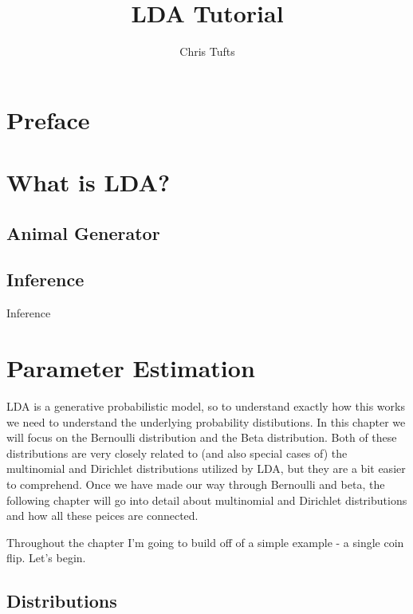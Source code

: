 \documentclass[]{book}
\title{LDA Tutorial}
\author{Chris Tufts}
\date{}
\theoremstyle{definition}
\theoremstyle{definition}
\theoremstyle{definition}
\theoremstyle{remark}
\begin{document}
\maketitle

{
\setcounter{tocdepth}{1}
\tableofcontents
}
\chapter*{Preface}\label{preface}

\chapter{What is LDA?}\label{what-is-lda}

\section{Animal Generator}\label{animal-generator}

\section{Inference}\label{inference}

Inference

\chapter{Parameter Estimation}\label{parameter-estimation}

LDA is a generative probabilistic model, so to understand exactly how
this works we need to understand the underlying probability
distibutions. In this chapter we will focus on the Bernoulli
distribution and the Beta distribution. Both of these distributions are
very closely related to (and also special cases of) the multinomial and
Dirichlet distributions utilized by LDA, but they are a bit easier to
comprehend. Once we have made our way through Bernoulli and beta, the
following chapter will go into detail about multinomial and Dirichlet
distributions and how all these peices are connected.

Throughout the chapter I'm going to build off of a simple example - a
single coin flip. Let's begin.

\section{Distributions}\label{distributions}
\end{document}
